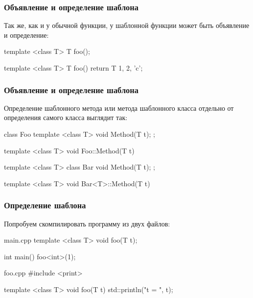 \documentclass[compress, 8pt, aspectratio=169]{beamer}
\begin{document}
  \begin{frame}[fragile]

    \frametitle{Объявление и определение шаблона}

    Так же, как и у обычной функции, у шаблонной функции может быть
    объявление и определение:

    \begin{myinplacelisting}[minted language=cpp]
template <class T>
T foo();

template <class T>
T foo() {
    return T {1, 2, 'c'};
}
    \end{myinplacelisting}

  \end{frame}

  \begin{frame}[fragile]

    \frametitle{Объявление и определение шаблона}

    Определение шаблонного метода или метода шаблонного класса
    отдельно от определения самого класса выглядит так:

    \begin{myinplacelisting}[minted language=cpp]
class Foo {
    template <class T>
    void Method(T t);
};

template <class T>
void Foo::Method(T t) {}

template <class T>
class Bar {
    void Method(T t);
};

template <class T>
void Bar<T>::Method(T t) {}
    \end{myinplacelisting}

  \end{frame}

  \begin{frame}[fragile]

    \frametitle{Определение шаблона}

    Попробуем скомпилировать программу из двух файлов:

    \begin{mytitledinplacelisting}[minted language=cpp]{main.cpp}
template <class T>
void foo(T t);

int main() {
    foo<int>(1);
}
    \end{mytitledinplacelisting}

    \begin{mytitledinplacelisting}[minted language=cpp]{foo.cpp}
#include <print>

template <class T>
void foo(T t) {
    std::println("t = {}", t);
}
    \end{mytitledinplacelisting}

  \end{frame}
\end{document}
